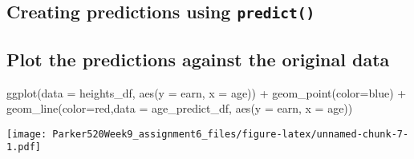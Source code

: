 \documentclass[
]{article}
\newenvironment{Shaded}{\begin{snugshade}}{\end{snugshade}}
\newcommand{\AttributeTok}[1]{\textcolor[rgb]{0.77,0.63,0.00}{#1}}
\newcommand{\FunctionTok}[1]{\textcolor[rgb]{0.00,0.00,0.00}{#1}}
\newcommand{\NormalTok}[1]{#1}
\newcommand{\OtherTok}[1]{\textcolor[rgb]{0.56,0.35,0.01}{#1}}
\newcommand{\SpecialCharTok}[1]{\textcolor[rgb]{0.00,0.00,0.00}{#1}}
\newcommand{\StringTok}[1]{\textcolor[rgb]{0.31,0.60,0.02}{#1}}
\begin{document}
\hypertarget{creating-predictions-using-predict}{%
\subsection{\texorpdfstring{Creating predictions using
\texttt{predict()}}{Creating predictions using predict()}}\label{creating-predictions-using-predict}}

\begin{Shaded}
\end{Shaded}

\hypertarget{plot-the-predictions-against-the-original-data}{%
\subsection{Plot the predictions against the original
data}\label{plot-the-predictions-against-the-original-data}}

\begin{Shaded}
\begin{Highlighting}[]
\FunctionTok{ggplot}\NormalTok{(}\AttributeTok{data =}\NormalTok{ heights\_df, }\FunctionTok{aes}\NormalTok{(}\AttributeTok{y =}\NormalTok{ earn, }\AttributeTok{x =}\NormalTok{ age)) }\SpecialCharTok{+}
  \FunctionTok{geom\_point}\NormalTok{(}\AttributeTok{color=}\StringTok{\textquotesingle{}blue\textquotesingle{}}\NormalTok{) }\SpecialCharTok{+}
  \FunctionTok{geom\_line}\NormalTok{(}\AttributeTok{color=}\StringTok{\textquotesingle{}red\textquotesingle{}}\NormalTok{,}\AttributeTok{data =}\NormalTok{ age\_predict\_df, }\FunctionTok{aes}\NormalTok{(}\AttributeTok{y =}\NormalTok{ earn, }\AttributeTok{x =}\NormalTok{ age))}
\end{Highlighting}
\end{Shaded}

\texttt{[image: Parker520Week9\_assignment6\_files/figure-latex/unnamed-chunk-7-1.pdf]}

\begin{Shaded}
\end{Shaded}
\end{document}

